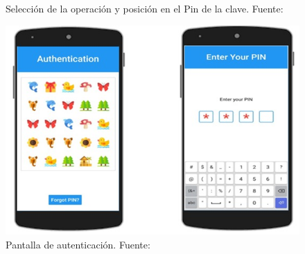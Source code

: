 \begin{anexos}
\begin{figure}[H]
\begin{minipage}[b]{0.5\linewidth}
		\caption{Selección de la operación y posición en el Pin de la clave. Fuente: \cite{kausar2022gra}  }          
	\end{minipage}
	\begin{minipage}[b]{0.4\linewidth} %
		\centering
		\includegraphics[width=\linewidth]{grapin-auth.jpg}
		\caption{Pantalla de autenticación. Fuente: \cite{kausar2022gra}}
			\label{gra-pin-end}
	\end{minipage}
	\label{gra-pin-screens}
\end{figure}




\begin{figure}


\end{figure}
\end{anexos}
